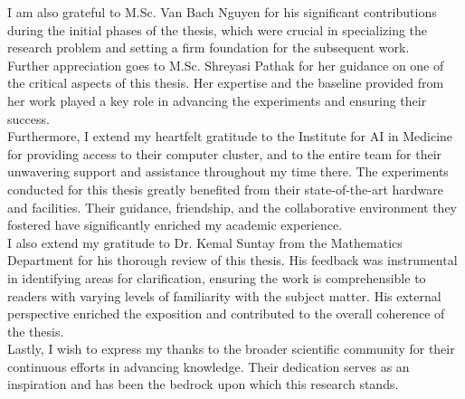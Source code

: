 I am also grateful to M.Sc. Van Bach Nguyen for his significant contributions during the initial phases of the thesis, which were crucial in specializing the research problem and setting a firm foundation for the subsequent work.\\

Further appreciation goes to M.Sc. Shreyasi Pathak for her guidance on one of the critical aspects of this thesis. Her expertise and the baseline provided from her work played a key role in advancing the experiments and ensuring their success.\\

Furthermore, I extend my heartfelt gratitude to the Institute for AI in Medicine for providing access to their computer cluster, and to the entire team for their unwavering support and assistance throughout my time there. The experiments conducted for this thesis greatly benefited from their state-of-the-art hardware and facilities. Their guidance, friendship, and the collaborative environment they fostered have significantly enriched my academic experience.\\

I also extend my gratitude to Dr. Kemal Suntay from the Mathematics Department for his thorough review of this thesis. His feedback was instrumental in identifying areas for clarification, ensuring the work is comprehensible to readers with varying levels of familiarity with the subject matter. His external perspective enriched the exposition and contributed to the overall coherence of the thesis.\\

Lastly, I wish to express my thanks to the broader scientific community for their continuous efforts in advancing knowledge. Their dedication serves as an inspiration and has been the bedrock upon which this research stands.\\

\vspace{10mm}

\cleardoublepage{}

\clearpage
\thispagestyle{empty}
\null
\newpage

